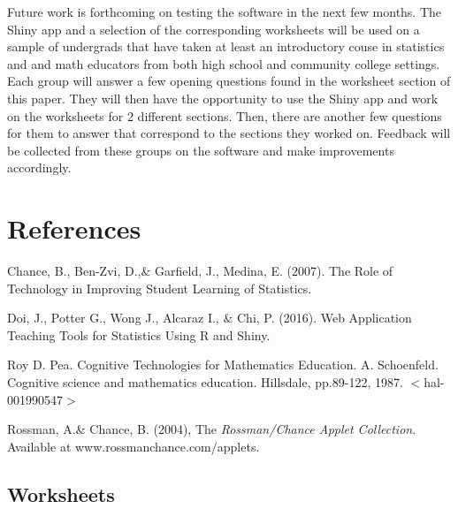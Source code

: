 \documentclass[11pt]{book}
\begin{document}
Future work is forthcoming on testing the software in the next few months. The Shiny app and a selection of the corresponding worksheets will be used on a sample of undergrads that have taken at least an introductory couse in statistics and and math educators from both high school and community college settings.  Each group  will answer a few opening questions found in the worksheet section of this paper. They will then have the opportunity to use the Shiny app and work on the worksheets for 2 different sections. Then, there are another few questions for them to answer that correspond to the sections they worked on.  Feedback will be collected from these groups on the software and make improvements accordingly.  

\newpage
\section{References}


 \begin{thebibliography}{1}

  Chance, B., Ben-Zvi, D.,$\&$ Garfield, J.,  Medina, E. (2007). The Role of Technology in Improving Student Learning of Statistics.

  Doi, J., Potter G., Wong J., Alcaraz I., $\&$ Chi, P. (2016). Web Application Teaching Tools for Statistics Using R and Shiny. 

 Roy D. Pea. Cognitive Technologies for Mathematics Education. A. Schoenfeld. Cognitive science and mathematics education. Hillsdale, pp.89-122, 1987. $<$hal-001990547$>$

 Rossman, A.$\&$ Chance, B. (2004), The \emph{Rossman/Chance Applet Collection}. Available at www.rossmanchance.com/applets.


  \end{thebibliography}



\subsection{Worksheets}
\end{document}
